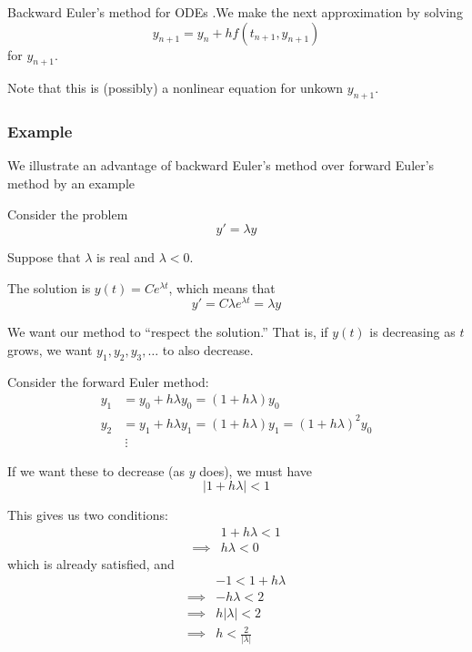 \documentclass[12pt,letterpaper]{article}
\begin{document}
\begin{algo}{Backward Euler's method for ODEs}
.We make the next approximation by solving
\begin{equation}
	y_{n+1} = y_n + h f(t_{n+1}, y_{n+1})
\end{equation}
for $y_{n+1}$.
\end{algo}

Note that this is (possibly) a nonlinear equation for unkown $y_{n+1}$.

\subsubsection{Example}
We illustrate an advantage of backward Euler's method over forward Euler's method by an example

Consider the problem
\begin{equation}
	y' = \lambda y
\end{equation}

Suppose that $\lambda$ is real and $\lambda < 0$.

The solution is $y(t) = Ce^{\lambda t}$, which means that
\begin{equation}
	y' = C\lambda e^{\lambda t} = \lambda y
\end{equation}

We want our method to ``respect the solution.'' That is, if $y(t)$ is decreasing as $t$ grows, we want $y_1, y_2, y_3, \dots$ to also decrease.

Consider the forward Euler method:
\begin{align}
	y_1 &= y_0 + h\lambda y_0 = (1+h \lambda)y_0 \\
	y_2 &= y_1 + h\lambda y_1 = (1+h \lambda)y_1 = (1+h\lambda)^2 y_0 \\
	&\ \vdots
\end{align}

If we want these to decrease (as $y$ does), we must have
\begin{equation}
	\lvert 1 + h\lambda \rvert < 1
\end{equation}

This gives us two conditions:
\begin{align}
	& 1+h\lambda < 1 \\
	\implies & h \lambda < 0
\end{align}
which is already satisfied, and
\begin{align}
	& -1 < 1 + h\lambda \\
	\implies & -h\lambda < 2 \\
	\implies & h \lvert \lambda \rvert < 2 \\
	\implies & h < \frac{2}{\lvert \lambda \rvert}
\end{align}
\end{document}
